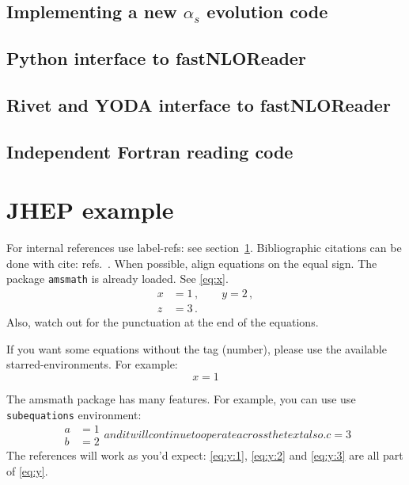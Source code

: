 \documentclass[a4paper,11pt]{article}
\begin{document}
\subsection{Implementing a new $\alpha_s$ evolution code}

\subsection{Python interface to fastNLOReader}

\subsection{Rivet and YODA interface to fastNLOReader}

\subsection{Independent Fortran reading code}


\clearpage
\appendix
\section{JHEP example}
\label{sec:intro}

For internal references use label-refs: see section~\ref{sec:intro}.
Bibliographic citations can be done with cite: refs.~\cite{a,b,c}.
When possible, align equations on the equal sign. The package
\texttt{amsmath} is already loaded. See \eqref{eq:x}.
\begin{equation}
\label{eq:x}
\begin{split}
x &= 1 \,,
\qquad
y = 2 \,,
\\
z &= 3 \,.
\end{split}
\end{equation}
Also, watch out for the punctuation at the end of the equations.


If you want some equations without the tag (number), please use the available
starred-environments. For example:
\begin{equation*}
x = 1
\end{equation*}

The amsmath package has many features. For example, you can use use
\texttt{subequations} environment:
\begin{subequations}\label{eq:y}
\begin{align}
\label{eq:y:1}
a & = 1
\\
\label{eq:y:2}
b & = 2
\end{align}
and it will continue to operate across the text also.
\begin{equation}
\label{eq:y:3}
c = 3
\end{equation}
\end{subequations}
The references will work as you'd expect: \eqref{eq:y:1},
\eqref{eq:y:2} and \eqref{eq:y:3} are all part of \eqref{eq:y}.
\end{document}
